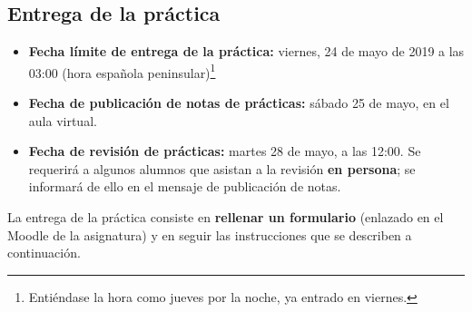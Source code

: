 \subsection{Entrega de la práctica}

\begin{itemize}
  \item \textbf{Fecha límite de entrega de la práctica:} viernes, 24 de mayo de 2019 a las 03:00 (hora española peninsular)\footnote{Entiéndase la hora como jueves por la noche, ya entrado en viernes.}

  \item \textbf{Fecha de publicación de notas de prácticas:} sábado 25 de mayo, en el aula virtual.

  \item \textbf{Fecha de revisión de prácticas:} martes 28 de mayo, a las 12:00. Se requerirá a algunos alumnos que asistan a la revisión {\bf en persona}; se informará de ello en el mensaje de publicación de notas.
\end{itemize}

La entrega de la práctica consiste en {\bf rellenar un formulario} (enlazado en el Moodle de la asignatura) y en seguir las instrucciones que se describen a continuación.

